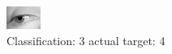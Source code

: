 \begin{figure}[h!]
\begin{center}
\includegraphics[width=0.60\columnwidth]{figures/ID3015_class_3_target_4.png}
\end{center}
\caption{ Classification: 3 actual target: 4}
\label{fig:ID3015_class_3_target_4}
\end{figure}
